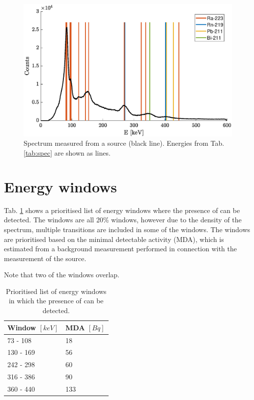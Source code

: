 \documentclass[a4paper,article]{memoir}
\begin{document}
\begin{figure}[h]
    \centering
    \includegraphics[width=\textwidth]{raspec.eps}
    \caption{Spectrum measured from a  source (black line). Energies from Tab. \ref{tab:spec} are shown as lines.}
    \label{fig:spec}
\end{figure}


\section*{Energy windows}

Tab. \ref{tab:windows} shows a prioritised list of energy windows where the 
presence of  can be detected. The windows are all 20\% 
windows, however due to the density of the spectrum, multiple transitions are 
included in some of the windows. The windows are prioritised based on the 
minimal detectable activity (MDA), which is estimated from a background 
measurement performed in connection with the measurement of the 
 source.

Note that two of the windows overlap.

\begin{table}[h]
	\centering
	\begin{tabular}{@{}ll@{}}
		\toprule
		Window $[\si{keV}]$ & MDA $[\si{Bq}]$ \\ \midrule
		73 - 108            & 18              \\
		130 - 169           & 56              \\
		242 - 298           & 60              \\
		316 - 386           & 90              \\
		360 - 440           & 133             \\ \bottomrule
	\end{tabular}
	\caption{Prioritised list of energy windows in which the presence of 
	 can be detected.}
	\label{tab:windows}
\end{table}
\end{document}
